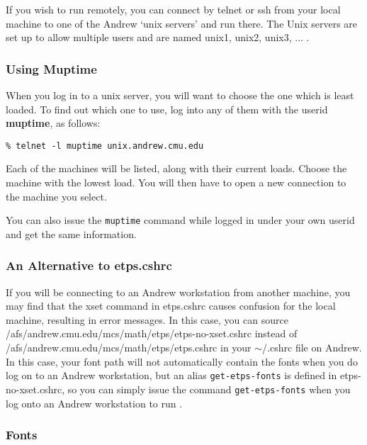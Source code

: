 \documentclass{article}
\begin{document}
If you wish to run {\ETPS} remotely, you can connect by telnet or ssh
from your local machine to one of the Andrew `unix servers' and run
{\ETPS} there. The Unix servers are set up to allow multiple users and
are named unix1, unix2, unix3, ... .

\subsubsection{Using Muptime}

When you log in to a unix server, you will want to choose the one which
is least loaded.  To find out which one to use, log into any of them
with the userid {\bf muptime}, as follows:

\begin{verbatim}
% telnet -l muptime unix.andrew.cmu.edu
\end{verbatim}

Each of the machines will be listed, along with their current loads.
Choose the machine with the lowest load.
You will then have to open a new  connection to the machine
you select.

You can also issue the {\tt muptime} command while logged in under your own
userid and get the same information.

\subsubsection{An Alternative to etps.cshrc}

If you will be connecting to an Andrew workstation from another
machine, you may find
that the xset command in etps.cshrc causes confusion for the local
machine, resulting in error messages. In this case, you can source\newline
/afs/andrew.cmu.edu/mcs/math/etps/etps-no-xset.cshrc\newline
instead of\newline
/afs/andrew.cmu.edu/mcs/math/etps/etps.cshrc\newline
in your $\sim$/.cshrc file on Andrew.
In this case, your font path will not automatically contain the {\ETPS}
fonts when you do log on to an Andrew workstation, but
an alias {\tt get-etps-fonts} is defined in etps-no-xset.cshrc,
so you can simply issue the command {\tt get-etps-fonts} when you log
onto an Andrew workstation to run {\ETPS}.

\subsubsection{Fonts}
\end{document}
